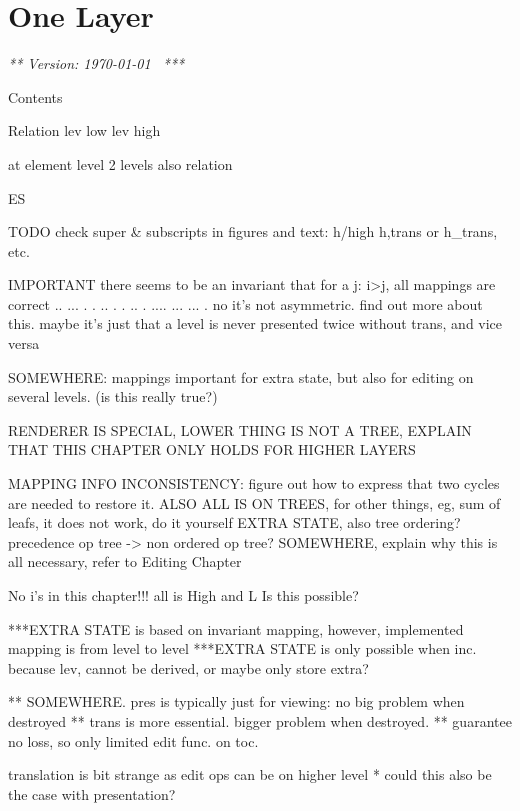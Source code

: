 \chapter{One Layer}
\label{chap:singleLayer}

{\em *** Version: \today~ ***}
\bc



Contents


Relation
lev low lev high

at element level 2 levels also relation

ES






TODO
check super & subscripts in figures and text: h/high h,trans or h_trans, etc.


IMPORTANT there seems to be an invariant that for a j:  i>j, all mappings are correct 
  ..           ...       
 .  .    ..   .   .   .. 
.    ....  ...     ...  .
 no it's not asymmetric. find out more about this.
 maybe it's just that a level is never presented twice without trans, and vice versa


SOMEWHERE: mappings important for extra state, but also for editing on several levels. (is this really true?)

RENDERER IS SPECIAL, LOWER THING IS NOT A TREE, EXPLAIN THAT THIS CHAPTER ONLY HOLDS FOR HIGHER LAYERS

MAPPING INFO INCONSISTENCY: figure out how to express that two cycles are needed to restore it.
ALSO ALL IS ON TREES, for other things, eg, sum of leafs, it does not work, do it yourself
EXTRA STATE, also tree ordering? precedence op tree -> non ordered op tree?
SOMEWHERE, explain why this is all necessary, refer to Editing Chapter

No i's in this chapter!!! all is High and L Is this possible?

***EXTRA STATE is based on invariant mapping, however, implemented mapping is from level to level
***EXTRA STATE is only possible when inc. because lev, cannot be derived, or maybe only store extra?

** SOMEWHERE. pres is typically just for viewing: no big problem when destroyed
** trans is more essential. bigger problem when destroyed.
** guarantee no loss, so only limited edit func. on toc.

translation is bit strange as edit ops can be on higher level
* could this also be the case with presentation?



